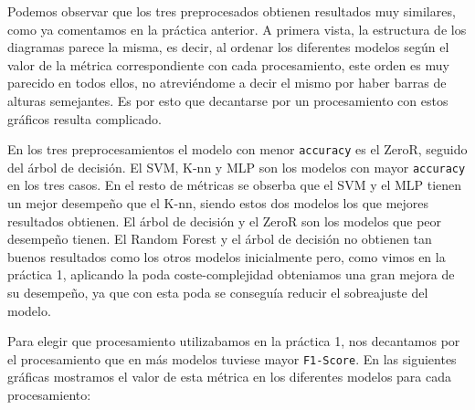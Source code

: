 \documentclass[a4]{article}
\begin{document}
Podemos observar que los tres preprocesados obtienen resultados muy similares, como ya comentamos en la práctica anterior. A primera vista, la estructura de los diagramas parece la misma, es decir, al ordenar los diferentes modelos según el valor de la métrica correspondiente con cada procesamiento, este orden es muy parecido en todos ellos, no atreviéndome a decir el mismo por haber barras de alturas semejantes. Es por esto que decantarse por un procesamiento con estos gráficos resulta complicado.

En los tres preprocesamientos el modelo con menor \texttt{accuracy} es el ZeroR, seguido del árbol de decisión. El SVM, K-nn y MLP son los modelos con mayor \texttt{accuracy} en los tres casos. En el resto de métricas se obserba que el SVM y el MLP tienen un mejor desempeño que el K-nn, siendo estos dos modelos los que mejores resultados obtienen. El árbol de decisión y el ZeroR son los modelos que peor desempeño tienen. El Random Forest y el árbol de decisión no obtienen tan buenos resultados como los otros modelos inicialmente pero, como vimos en la práctica 1, aplicando la poda coste-complejidad obteniamos una gran mejora de su desempeño, ya que con esta poda se conseguía reducir el sobreajuste del modelo.

Para elegir que procesamiento utilizabamos en la práctica 1, nos decantamos por el procesamiento que en más modelos tuviese mayor \texttt{F1-Score}. En las siguientes gráficas mostramos el valor de esta métrica en los diferentes modelos para cada procesamiento: 

\begin{figure}[H]
  \centering
\end{figure}
\end{document}

